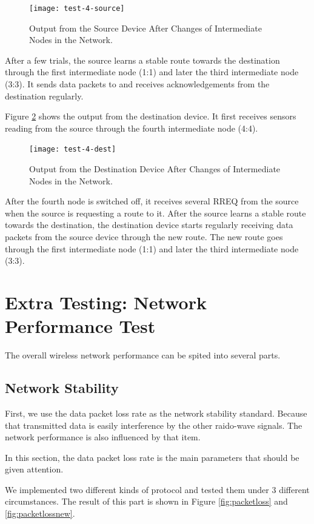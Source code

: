 \begin{figure}
\centering
\texttt{[image: test-4-source]}
\caption{Output from the Source Device After Changes of Intermediate Nodes in the Network.}
\label{fig:test-4-source}
\end{figure}


After a few trials, the source learns a stable route towards the destination through the first intermediate node (1:1) and later the third intermediate node (3:3).
It sends data packets to and receives acknowledgements from the destination regularly.

Figure \ref{fig:test-4-dest} shows the output from the destination device.
It first receives sensors reading from the source through the fourth intermediate node (4:4). 

\begin{figure}
\centering
\texttt{[image: test-4-dest]}
\caption{Output from the Destination Device After Changes of Intermediate Nodes in the Network.}
\label{fig:test-4-dest}
\end{figure}

After the fourth node is switched off, it receives several RREQ from the source when the source is requesting a route to it.
After the source learns a stable route towards the destination, the destination device starts regularly receiving data packets from the source device through the new route.
The new route goes through the first intermediate node (1:1) and later the third intermediate node (3:3).

\section{Extra Testing: Network Performance Test}

The overall wireless network performance can be spited into several parts.

\subsection{Network Stability}

First, we use the data packet loss rate as the network stability standard. Because that transmitted data is easily interference by the other raido-wave signals. The network performance is also influenced by that item.

In this section, the data packet loss rate is the main parameters that should be given attention.

We implemented two different kinds of protocol and tested them under 3 different circumstances. The result of this part is shown in Figure \ref{fig:packetloss} and \ref{fig:packetlossnew}.

